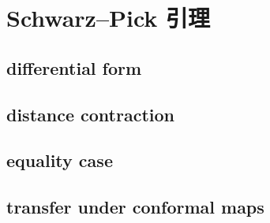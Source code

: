 \section{Schwarz–Pick 引理}
\label{b3:sec:0603}


\subsection{differential form}
\label{b3:subsec:060301}

\subsection{distance contraction}
\label{b3:subsec:060302}

\subsection{equality case}
\label{b3:subsec:060303}

\subsection{transfer under conformal maps}
\label{b3:subsec:060304}


